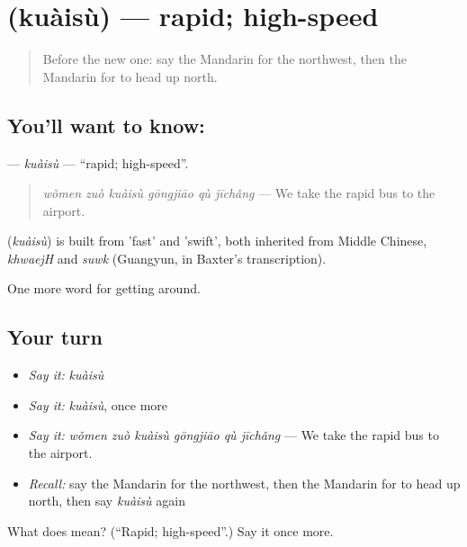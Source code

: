 \section[\texorpdfstring{\zh{快速} (kuàisù)}{快速 (kuàisù)}]{ (kuàisù) — rapid; high-speed}

\label{lesson:ZH-C422-kuaisu}



\begin{quote}
Before the new one: say the Mandarin for the northwest, then the Mandarin for to head up north.
\end{quote}

\subsection*{You'll want to know: }
\textbf{} — \emph{kuàisù} — \textquotedblleft{}rapid; high-speed\textquotedblright{}.

\begin{quote}
\textbf{} \emph{wǒmen zuò kuàisù gōngjiāo qù jīchǎng} — We take the rapid bus to the airport.
\end{quote}

\begin{cousinweb}
\textbf{} (\emph{kuàisù}) is built from  'fast' and  'swift', both inherited from Middle Chinese, \emph{khwaejH} and \emph{suwk} (Guangyun, in Baxter's transcription).
\end{cousinweb}

\begin{grammarlens}[title={What you've built}]
One more word for getting around.
\end{grammarlens}

\subsection*{Your turn}
\begin{itemize}
\raggedright
  \item \emph{Say it:} \emph{kuàisù}
  \item \emph{Say it:} \emph{kuàisù}, once more
  \item \emph{Say it:} \emph{wǒmen zuò kuàisù gōngjiāo qù jīchǎng} — We take the rapid bus to the airport.
  \item \emph{Recall:} say the Mandarin for the northwest, then the Mandarin for to head up north, then say \emph{kuàisù} again
\end{itemize}

\begin{tcolorbox}[breakable,colback=teal!4,colframe=teal!35!black,title={Before you move on}]
What does  mean? (\textquotedblleft{}Rapid; high-speed\textquotedblright{}.) Say it once more.
\end{tcolorbox}
